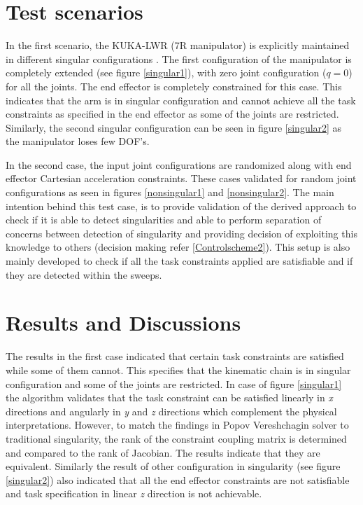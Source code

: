 \section{Test scenarios}
In the first scenario, the KUKA-LWR (7R manipulator) is explicitly maintained in different singular configurations . The first configuration of the manipulator is completely extended (see figure \ref{singular1}), with zero joint configuration ($q=0$) for all the joints. The end effector is completely constrained for this case. This indicates that the arm is in singular configuration and cannot achieve all the task constraints as specified in the end effector as some of the joints are restricted. Similarly, the second singular configuration can be seen in figure \ref{singular2} as the manipulator loses few DOF's.


In the second case, the input joint configurations are randomized along with end effector Cartesian acceleration constraints. These cases validated for random joint configurations as seen in figures \ref{nonsingular1} and \ref{nonsingular2}. The main intention behind this test case, is to provide validation of the derived approach to check if it is able to detect singularities and able to perform separation of concerns between detection of singularity and providing decision of exploiting this knowledge to others (decision making refer \ref{Controlscheme2}). This setup is also mainly developed to check if all the task constraints applied are satisfiable and if they are detected within the sweeps. 

\section{Results and Discussions}
The results in the first case indicated that certain task constraints are satisfied while some of them cannot. This specifies that the kinematic chain is in singular configuration and some of the joints are restricted. In case of figure \ref{singular1} the algorithm validates that the task constraint can be satisfied linearly in \textit{x} directions and angularly in \textit{y} and \textit{z} directions which complement the physical interpretations. However, to match the findings in Popov Vereshchagin solver to traditional singularity, the rank of the constraint coupling matrix is determined and compared to the rank of Jacobian. The results indicate that they are equivalent. Similarly the result of other configuration in singularity (see figure \ref{singular2}) also indicated that all the end effector constraints are not satisfiable and task specification in linear \textit{z} direction is not achievable.

